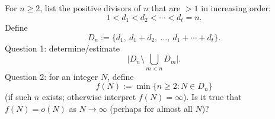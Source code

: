 For $n\ge 2$, list the positive divisors of $n$ that are $>1$ in increasing order:
\[
1<d_1<d_2<\cdots<d_t=n.
\]
Define
\[
D_n:=\{d_1,\ d_1+d_2,\ \dots,\ d_1+\cdots+d_t\}.
\]
Question 1: determine/estimate
\[
\bigl|D_n\setminus \bigcup_{m<n} D_m\bigr|.
\]
Question 2: for an integer $N$, define
\[
f(N):=\min\{n\ge 2: N\in D_n\}
\]
(if such $n$ exists; otherwise interpret $f(N)=\infty$). Is it true that $f(N)=o(N)$ as $N\to\infty$ (perhaps for almost all $N$)?
